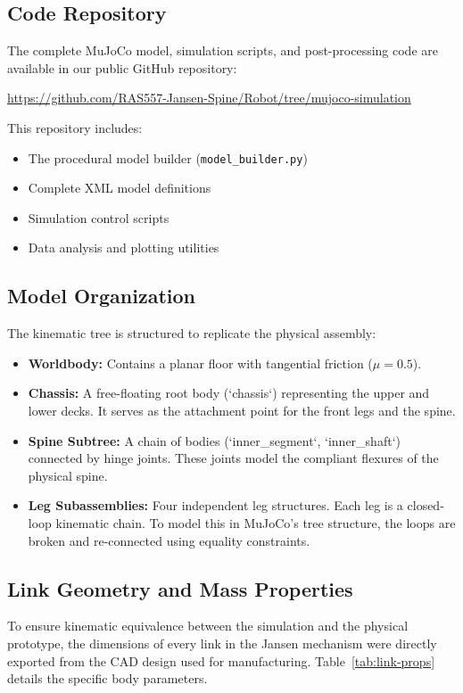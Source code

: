 \documentclass[11pt, a4paper]{article}
\begin{document}
\subsection{Code Repository}
\label{subsec:code-repository}
The complete MuJoCo model, simulation scripts, and post-processing code are available in our public GitHub repository:
\begin{center}
\url{https://github.com/RAS557-Jansen-Spine/Robot/tree/mujoco-simulation}
\end{center}
This repository includes:
\begin{itemize}
    \item The procedural model builder (\texttt{model\_builder.py})
    \item Complete XML model definitions
    \item Simulation control scripts
    \item Data analysis and plotting utilities
\end{itemize}

\subsection{Model Organization} \label{subsec:model-organization}
The kinematic tree is structured to replicate the physical assembly:
\begin{itemize}
    \item \textbf{Worldbody:} Contains a planar floor with tangential friction ($\mu=0.5$).
    \item \textbf{Chassis:} A free-floating root body (`chassis`) representing the upper and lower decks. It serves as the attachment point for the front legs and the spine.
    \item \textbf{Spine Subtree:} A chain of bodies (`inner\_segment`, `inner\_shaft`) connected by hinge joints. These joints model the compliant flexures of the physical spine.
    \item \textbf{Leg Subassemblies:} Four independent leg structures. Each leg is a closed-loop kinematic chain. To model this in MuJoCo's tree structure, the loops are broken and re-connected using equality constraints.
\end{itemize}

\subsection{Link Geometry and Mass Properties}
To ensure kinematic equivalence between the simulation and the physical prototype, the dimensions of every link in the Jansen mechanism were directly exported from the CAD design used for manufacturing. Table~\ref{tab:link-props} details the specific body parameters.
\end{document}
